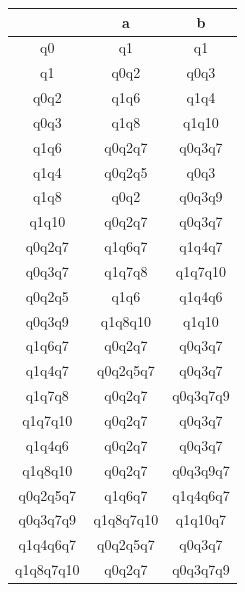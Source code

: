 \documentclass[a4paper]{article}
\begin{document}
\begin{enumerate}
\begin{tabular}{|*{3}{c|}}
\textbf{ } & a & b\\
\hline\hline
q0 & q1 & q1 \\
\hline\hline
q1 & q0q2 & q0q3 \\
\hline\hline
q0q2 & q1q6 & q1q4 \\
\hline\hline
q0q3 & q1q8 & q1q10 \\
\hline\hline
q1q6 & q0q2q7 & q0q3q7 \\
\hline\hline
q1q4 & q0q2q5 & q0q3 \\
\hline\hline
q1q8 & q0q2 & q0q3q9 \\
\hline\hline
q1q10 & q0q2q7 & q0q3q7 \\
\hline\hline
q0q2q7 & q1q6q7 & q1q4q7 \\
\hline\hline
q0q3q7 & q1q7q8 & q1q7q10 \\
\hline\hline
q0q2q5 & q1q6 & q1q4q6 \\
\hline\hline
q0q3q9 & q1q8q10 & q1q10 \\
\hline\hline
q1q6q7 & q0q2q7 & q0q3q7 \\
\hline\hline
q1q4q7 & q0q2q5q7 & q0q3q7 \\
\hline\hline
q1q7q8 & q0q2q7 & q0q3q7q9 \\
\hline\hline
q1q7q10 & q0q2q7 & q0q3q7 \\
\hline\hline
q1q4q6 & q0q2q7 & q0q3q7 \\
\hline\hline
q1q8q10 & q0q2q7 & q0q3q9q7 \\
\hline\hline
q0q2q5q7 & q1q6q7 & q1q4q6q7 \\
\hline\hline
q0q3q7q9 & q1q8q7q10 & q1q10q7 \\
\hline\hline
q1q4q6q7 & q0q2q5q7 & q0q3q7 \\
\hline\hline
q1q8q7q10 & q0q2q7 & q0q3q7q9 \\

\end{tabular}
\\


\end{enumerate}
\end{document}
